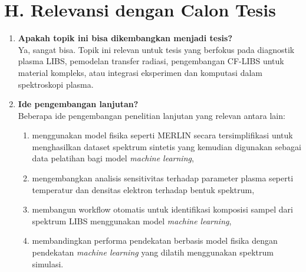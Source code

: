 \documentclass[12pt,a4paper]{article}
\begin{document}
\section*{H. Relevansi dengan Calon Tesis}
\begin{enumerate}
  \item \textbf{Apakah topik ini bisa dikembangkan menjadi tesis?}\\
  Ya, sangat bisa. Topik ini relevan untuk tesis yang berfokus pada diagnostik plasma LIBS, pemodelan transfer radiasi, pengembangan CF-LIBS untuk material kompleks, atau integrasi eksperimen dan komputasi dalam spektroskopi plasma.

  \item \textbf{Ide pengembangan lanjutan?}\\
  Beberapa ide pengembangan penelitian lanjutan yang relevan antara lain:
  \begin{enumerate}
    \item menggunakan model fisika seperti MERLIN secara tersimplifikasi untuk menghasilkan dataset spektrum sintetis yang kemudian digunakan sebagai data pelatihan bagi model \textit{machine learning},
    \item mengembangkan analisis sensitivitas terhadap parameter plasma seperti temperatur dan densitas elektron terhadap bentuk spektrum,
    \item membangun workflow otomatis untuk identifikasi komposisi sampel dari spektrum LIBS menggunakan model \textit{machine learning},
    \item membandingkan performa pendekatan berbasis model fisika dengan pendekatan \textit{machine learning} yang dilatih menggunakan spektrum simulasi.
  \end{enumerate}
\end{enumerate}

\vfill
\end{document}
